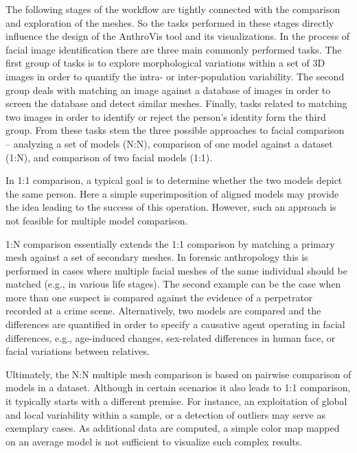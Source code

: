 \documentclass[final,5p,times]{elsarticle}
\begin{document}
The following stages of the workflow are tightly connected with the comparison and exploration of the meshes.
So the tasks performed in these stages directly influence the design of the AnthroVis tool and its visualizations.
In the process of facial image identification there are three main commonly performed tasks.
The first group of tasks is to explore morphological variations within a set of 3D images in order to quantify the intra- or inter-population variability.
The second group deals with matching an image against a database of images in order to screen the database and detect similar meshes.
Finally, tasks related to matching two images in order to identify or reject the person's identity form the third group.
From these tasks stem the three possible approaches to facial comparison -- analyzing a set of models (N:N), comparison of one model against a dataset (1:N), and comparison of two facial models (1:1). 

In 1:1 comparison, a typical goal is to determine whether the two models depict the same person. 
Here a simple superimposition of aligned models may provide the idea leading to the success of this operation.
However, such an approach is not feasible for multiple model comparison.

1:N comparison essentially extends the 1:1 comparison by matching a primary mesh against a set of secondary meshes. 
In forensic anthropology this is performed in cases where multiple facial meshes of the same individual should be matched (e.g., in various life stages).
The second example can be the case when more than one suspect is compared against the evidence of a perpetrator recorded at a crime scene. 
Alternatively, two models are compared and the differences are quantified in order to specify a causative agent operating in facial differences, e.g., age-induced changes, sex-related differences in human face, or facial variations between relatives.

Ultimately, the N:N multiple mesh comparison is based on pairwise comparison of models in a dataset. 
Although in certain scenarios it also leads to 1:1 comparison, it typically starts with a different premise.
For instance, an exploitation of global and local variability within a sample, or a detection of outliers may serve as exemplary cases.
As additional data are computed, a simple color map mapped on an average model is not sufficient to visualize such complex results.
\end{document}
